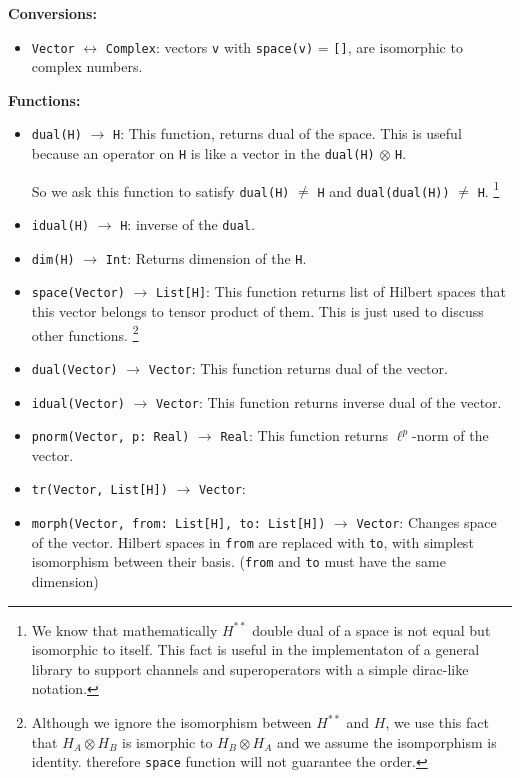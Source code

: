 \documentclass[a4paper,11pt]{article}
\def\co{\lstinline}
\begin{document}
\textbf{Conversions: }

\begin{itemize}
	\item \co|Vector| \(\leftrightarrow\) \co|Complex|: vectors \co|v| with \co|space(v)| = \co|[]|, are isomorphic to complex numbers.
\end{itemize}

\textbf{Functions: }

\begin{itemize}
	\item \co|dual(H)| \(\to\) \co|H|:
	    This function, returns dual of the space. This is useful because an operator on \co|H| is like a vector in the \co|dual(H)| \(\otimes\) \co|H|.

	    So we ask this function to satisfy \co|dual(H)| \(\ne\) \co|H| and \co|dual(dual(H))| \(\ne\) \co|H|.%
	    \footnote{We know that mathematically \(H^{**}\) double dual of a space is not equal but isomorphic to itself.
            This fact is useful in the implementaton of a general library to support channels and superoperators with a simple dirac-like notation.}
    \item \co|idual(H)| \(\to\) \co|H|:
        inverse of the \co|dual|.
    \item \co|dim(H)| \(\to\) \co|Int|:
        Returns dimension of the \co|H|.
    \item \co|space(Vector)| \(\to\) \co|List[H]|:
        This function returns list of Hilbert spaces that this vector belongs to tensor product of them.
        This is just used to discuss other functions.%
        \footnote{Although we ignore the isomorphism between \(H^{**}\) and \(H\), we use this fact that $H_A \otimes H_B$ is ismorphic to $H_B \otimes H_A$ and we assume the isomporphism is identity. therefore \co|space| function will not guarantee the order.}
	\item \co|dual(Vector)| \(\to\) \co|Vector|:
	    This function returns dual of the vector.
	\item \co|idual(Vector)| \(\to\) \co|Vector|:
	    This function returns inverse dual of the vector.
	\item \co|pnorm(Vector, p: Real)| \(\to\) \co|Real|:
	    This function returns $\ell^p$-norm of the vector.
	\item \co|tr(Vector, List[H])| \(\to\) \co|Vector|:
    \item \co|morph(Vector, from: List[H], to: List[H])| \(\to\) \co|Vector|:
        Changes space of the vector. Hilbert spaces in \co|from| are replaced with \co|to|, with simplest isomorphism between their basis. (\co|from| and \co|to| must have the same dimension) 
\end{itemize}
\end{document}
